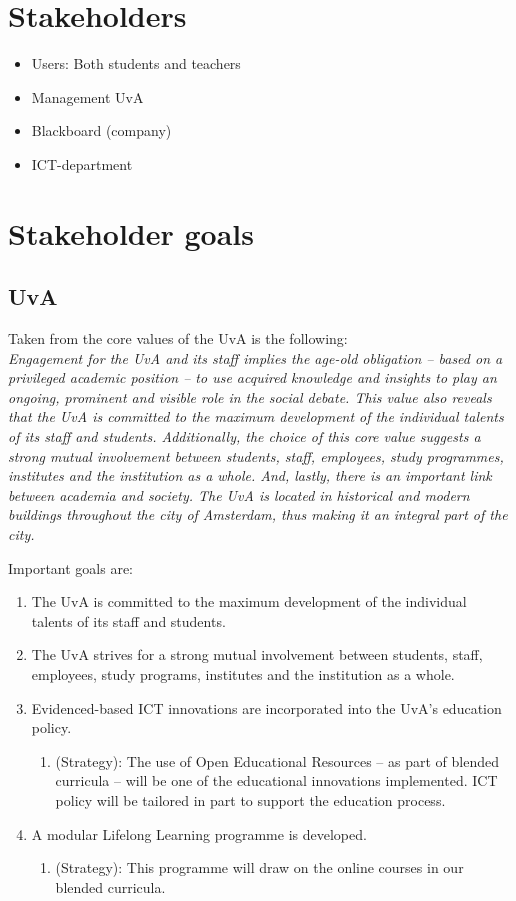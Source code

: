 \section{Stakeholders}
\begin{itemize}
	\item Users: Both students and teachers
	\item Management UvA
	\item Blackboard (company)
	\item ICT-department
\end{itemize}

\section{Stakeholder goals}\label{ch:stakeholder_goals}
\subsection{UvA}
\label{uva_goals}
Taken from the core values of the UvA is the following: \\
\textit{Engagement for the UvA and its staff implies the age-old obligation – based on a privileged academic position – to use acquired knowledge and insights to play an ongoing, prominent and visible role in the social debate. This value also reveals that the UvA is committed to the maximum development of the individual talents of its staff and students. Additionally, the choice of this core value suggests a strong mutual involvement between students, staff, employees, study programmes, institutes and the institution as a whole. And, lastly, there is an important link between academia and society. The UvA is located in historical and modern buildings throughout the city of Amsterdam, thus making it an integral part of the city.}

Important goals are:
\begin{enumerate}
	\item The UvA is committed to the maximum development of the individual talents of its staff and students.\cite{uva_mission}
	\item The UvA strives for a strong mutual involvement between students, staff, employees, study programs, institutes and the institution as a whole.\cite{uva_mission}
	\item Evidenced-based ICT innovations are incorporated into the UvA’s education policy.\cite{uva_strategic_plan} \begin{enumerate}
		\item (Strategy): The use of Open Educational Resources – as part of blended curricula – will be one of the educational innovations implemented. ICT policy will be tailored in part to support the education process. 
	\end{enumerate}
	\item A modular Lifelong Learning programme is developed.\cite{uva_strategic_plan} \begin{enumerate}
		\item (Strategy): This programme will draw on the online
		courses in our blended curricula. 
	\end{enumerate}
\end{enumerate}

